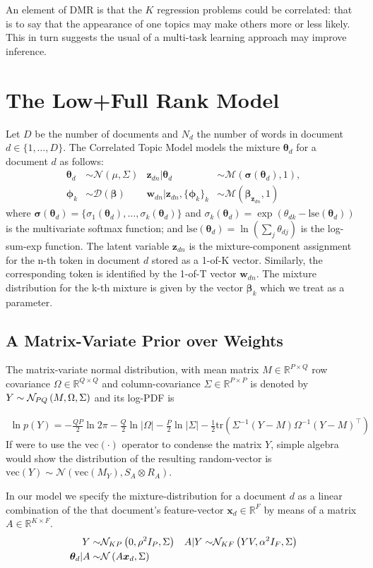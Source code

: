 \documentclass[10pt,fleqn]{article}
\newcommand \vecf[1] {
    \text{vec}\left(#1\right)
}
\newcommand \halve[1] {
	\frac{#1}{2}
}
\newcommand \half {
    \halve{1}
}
\newcommand \tr { \text{tr} }
\newcommand \T { ^\top }
\newcommand \vv[1] { \bm #1 }
\newcommand \wdn[0]  { { \vv{w}_{dn} } }
\newcommand \zdn[0]  { { \vv{z}_{dn} } }
\newcommand \thd[0]  { { \vv \theta_d } }
\newcommand \thdk[0] { { \theta_{dk} } }
\newcommand \thdj[0] { { \theta_{dj} } }
\newcommand \pk      { { \vv \phi_k } }
\newcommand \xd      { { \vv x_d } }
\newcommand \axd     { A\bm x_d}
\newcommand \nor[2]   { \mathcal{N} \left( {#1}, {#2} \right) }
\newcommand \muln[2]  { \mathcal{M} \left( {#1},{#2} \right) }
\newcommand \dir[1]   { \mathcal{D} \left( {#1} \right) }
\newcommand \dir[1]   { \mathcal{D} \left( {#1} \right) }
\newcommand \beta[1]  { \mathcal{B}eta \left( {#1}, {#2} \right) }
\newcommand \Tr[1]   { \tr \left(  {#1}  \right) }
\newcommand \VReal[1] { { \mathbb{R}^{#1} } }
\newcommand \MReal[2] { { \mathbb{R}^{#1 \times #2} } }
\newcommand \inv[1] { {#1}^{-1} }
\newcommand \lse { \text{lse} }
\begin{document}
An element of DMR is that the $K$ regression problems could be correlated: that is to say that the appearance of one topics may make others more or less likely. This in turn suggests the usual of a multi-task learning approach may improve inference.

\section{The Low+Full Rank Model}
Let $D$ be the number of documents and $N_d$ the number of words in document $d\in\{1,\ldots,D\}$. The Correlated Topic Model models the mixture $\thd$ for a document $d$ as follows:
\begin{align}
\thd &\sim \nor{\mu}{\Sigma}
&\zdn | \thd &\sim \muln {\vv{\sigma}(\thd)}{1} ,\\
\pk &\sim\dir{\vv{\beta}}
&\wdn | \zdn , \{\pk\}_k &\sim \muln{\vv{\beta}_{\zdn}}{1}
\end{align}
where $\vv{\sigma}(\thd) = \{\sigma_1(\thd), \ldots, \sigma_k(\thd)\}$ and $\sigma_k(\thd) = \exp(\thdk - \lse(\thd))$ is the multivariate softmax function; and $\lse(\thd) = \ln\left(\sum_j \thdj \right)$ is the log-sum-exp function. The latent variable $\zdn$ is the mixture-component assignment for the n-th token in document $d$ stored as a 1-of-K vector. Similarly, the corresponding token is identified by the 1-of-T vector $\wdn$. The mixture distribution for the k-th mixture is given by the vector $\vv{\beta}_k$ which we treat as a parameter.

\subsection{A Matrix-Variate Prior over Weights}
The matrix-variate normal distribution, with mean matrix $M \in \MReal{P}{Q}$ row covariance $\Omega \in \MReal{Q}{Q}$ and column-covariance $\Sigma \in \MReal{P}{P}$ is denoted by $Y \sim \mathcal{N}_{{PQ}} \left(M, \Omega, \Sigma\right)$ and its log-PDF is

\begin{align}
\ln p(Y) = 
-\halve{QP} \ln 2\pi
-\halve{Q}\ln |\Omega|
-\halve{P}\ln |\Sigma|
-\half
\Tr{
    \inv{\Sigma}(Y - M)\inv{\Omega}(Y - M)\T
}
\end{align}
If were to use the $\vecf{\cdot}$ operator to condense the matrix $Y$, simple algebra would show the distribution of the resulting random-vector is $\vecf{Y} \sim \nor{\vecf{M_Y}}{S_A \otimes R_A}$.

In our model we specify the mixture-distribution for a document $d$ as a linear combination of the that document's feature-vector $\xd \in \VReal{F}$ by means of a matrix $A \in \MReal{K}{F}$.
\begin{align}
Y \sim & \mnord{KP}{0}{\rho^2 I_P}{\Sigma} & A|Y \sim & \mnord{KF}{YV}{\alpha^2 I_F}{\Sigma} \\
\thd | A \sim & \nor{\axd}{\Sigma}
\end{align}
\end{document}
